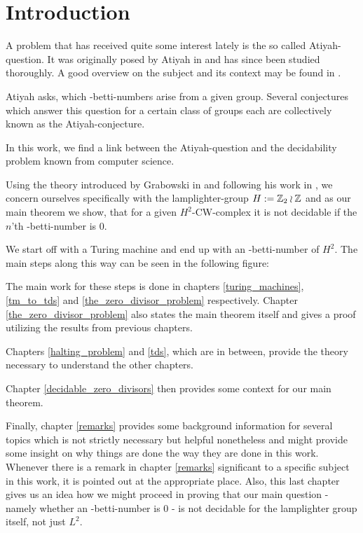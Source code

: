 \section{Introduction}

A problem that has received quite some interest lately is the so called Atiyah-question.
It was originally posed by Atiyah in \cite{ati76} and has since been studied thoroughly.
A good overview on the subject and its context may be found in \cite{luc02}.

Atiyah asks, which \ltwo-betti-numbers arise from a given group.
Several conjectures which answer this question for a certain class of groups each are collectively known as the Atiyah-conjecture.

In this work, we find a link between the Atiyah-question and the decidability problem known from computer science.

Using the theory introduced by Grabowski in \cite{gra14} and following his work in \cite{gra14-2}, we concern ourselves specifically with the lamplighter-group $H := \mathbb{Z}_2 \wr \mathbb{Z}$ and as our main theorem we show, that for a given $H^2$-CW-complex it is not decidable if the $n$'th \ltwo-betti-number is $0$.

We start off with a Turing machine and end up with an \ltwo-betti-number of $H^2$.
The main steps along this way can be seen in the following figure:
\begin{figure}[H]
	\centering
	
\end{figure}
The main work for these steps is done in chapters \ref{turing_machines}, \ref{tm_to_tds} and \ref{the_zero_divisor_problem} respectively.
Chapter \ref{the_zero_divisor_problem} also states the main theorem itself and gives a proof utilizing the results from previous chapters.

Chapters \ref{halting_problem} and \ref{tds}, which are in between, provide the theory necessary to understand the other chapters.

Chapter \ref{decidable_zero_divisors} then provides some context for our main theorem.

Finally, chapter \ref{remarks} provides some background information for several topics which is not strictly necessary but helpful nonetheless and might provide some insight on why things are done the way they are done in this work.
Whenever there is a remark in chapter \ref{remarks} significant to a specific subject in this work, it is pointed out at the appropriate place.
Also, this last chapter gives us an idea how we might proceed in proving that our main question - namely whether an \ltwo-betti-number is $0$ - is not decidable for the lamplighter group itself, not just $L^2$.
